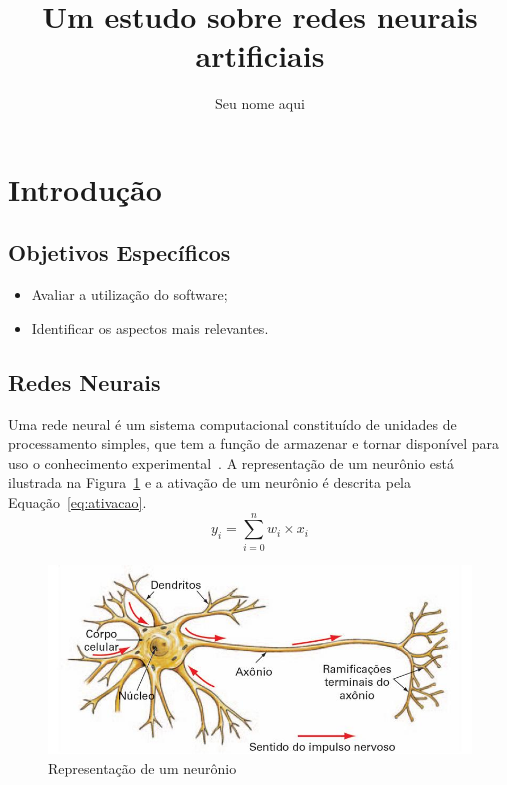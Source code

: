 \documentclass[a4paper, 12pt]{article}
\author{Seu nome aqui}
\title{Um estudo sobre redes neurais artificiais}
\begin{document}
	\maketitle
\section{Introdução}
\subsection{Objetivos Específicos}
\begin{itemize}
	\item Avaliar a utilização do software;
	\item Identificar os aspectos mais relevantes.
\end{itemize}
\subsection{Redes Neurais}
Uma rede neural é um sistema computacional constituído de unidades de processamento simples, que tem a função de armazenar e tornar disponível para uso o conhecimento experimental~\cite{haykinredes, LeCun1990}.
A representação de um neurônio está ilustrada na Figura~\ref{fig:neuronio} e a ativação de um neurônio é descrita pela Equação~\ref{eq:ativacao}. 
\begin{equation}
y_i = \sum_{i=0}^{n} w_i \times x_i
\end{equation}\label{eq:ativacao}

\begin{figure}[htb]
	\centering
	\includegraphics[scale=.3]{neuronio}
	\caption{Representação de um neurônio}\label{fig:neuronio}
\end{figure}



\end{document}
